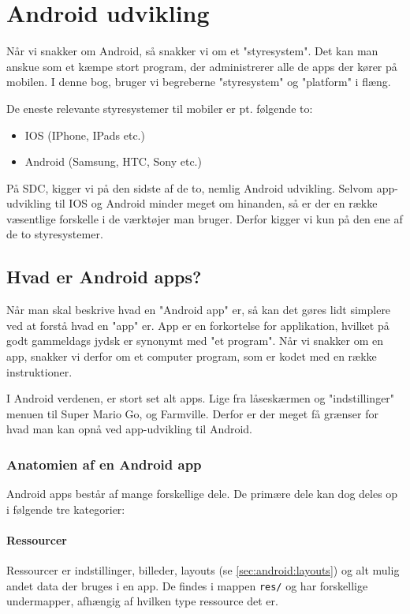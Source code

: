 \chapter{Android udvikling}

Når vi snakker om Android, så snakker vi om et "styresystem". Det kan man anskue som et kæmpe stort program, der administrerer alle de apps der kører på mobilen. I denne bog, bruger vi begreberne "styresystem" og "platform" i flæng.

De eneste relevante styresystemer til mobiler er pt. følgende to:

\begin{itemize}
	\item IOS (IPhone, IPads etc.)
	\item Android (Samsung, HTC, Sony etc.)
\end{itemize}

På SDC, kigger vi på den sidste af de to, nemlig Android udvikling. Selvom app-udvikling til IOS og Android minder meget om hinanden, så er der en række væsentlige forskelle i de værktøjer man bruger. Derfor kigger vi kun på den ene af de to styresystemer.

\section{Hvad er Android apps?}
Når man skal beskrive hvad en "Android app" er, så kan det gøres lidt simplere ved at forstå hvad en "app" er. App er en forkortelse for applikation, hvilket på godt gammeldags jydsk er synonymt med "et program". Når vi snakker om en app, snakker vi derfor om et computer program, som er kodet med en række instruktioner.

I Android verdenen, er stort set alt apps. Lige fra låseskærmen og "indstillinger" menuen til Super Mario Go, og Farmville. Derfor er der meget få grænser for hvad man kan opnå ved app-udvikling til Android.


\subsection{Anatomien af en Android app}
Android apps består af mange forskellige dele. De primære dele kan dog deles op i følgende tre kategorier:

\subsubsection{Ressourcer}
Ressourcer er indstillinger, billeder, layouts (se \autoref{sec:android:layouts}) og alt mulig andet data der bruges i en app. De findes i mappen \texttt{res/} og har forskellige undermapper, afhængig af hvilken type ressource det er.

